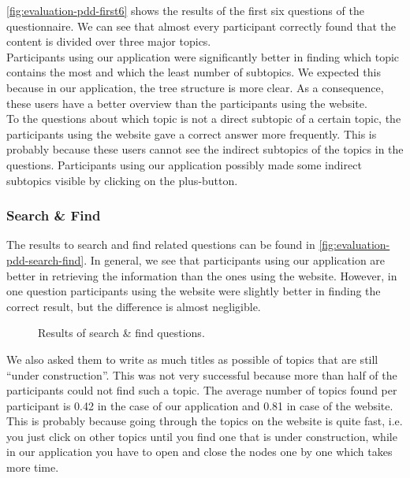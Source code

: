 \autoref{fig:evaluation-pdd-first6} shows the results of the first six questions of the questionnaire. We can see that almost every participant correctly found that the content is divided over three major topics.\\

Participants using our application were significantly better in finding which topic contains the most and which the least number of subtopics. We expected this because in our application, the tree structure is more clear. As a consequence, these users have a better overview than the participants using the website.\\

To the questions about which topic is not a direct subtopic of a certain topic, the participants using the website gave a correct answer more frequently. This is probably because these users cannot see the indirect subtopics of the topics in the questions. Participants using our application possibly made some indirect subtopics visible by clicking on the plus-button.

\subsubsection{Search \& Find}
The results to search and find related questions can be found in \autoref{fig:evaluation-pdd-search-find}. In general, we see that participants using our application are better in retrieving the information than the ones using the website. However, in one question participants using the website were slightly better in finding the correct result, but the difference is almost negligible.

\begin{figure}[H]
	\centering
	\caption{Results of search \& find questions.}
	\label{fig:evaluation-pdd-search-find}
\end{figure}

We also asked them to write as much titles as possible of topics that are still ``under construction''. This was not very successful because more than half of the participants could not find such a topic. The average number of topics found per participant is 0.42 in the case of our application and 0.81 in case of the website. This is probably because going through the topics on the website is quite fast, i.e. you just click on other topics until you find one that is under construction, while in our application you have to open and close the nodes one by one which takes more time.\\

